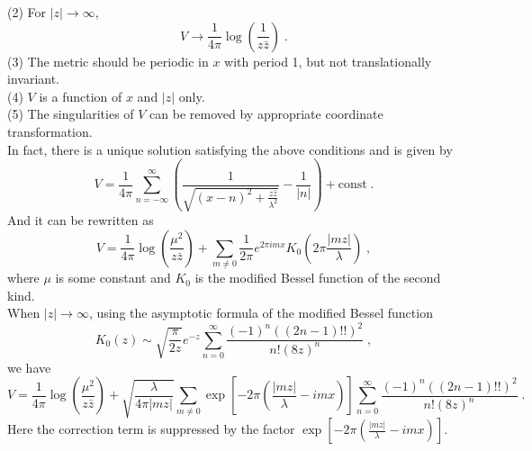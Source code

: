 \begin{survey}
(2) For $|z|\rightarrow \infty$,
$$V\rightarrow \frac{1}{4\pi}\log\left(\frac{1}{z\bar{z}}\right)\; .$$
(3) The metric should be periodic in $x$ with period 1, but not translationally invariant.\\
(4) $V$ is a function of $x$ and $|z|$ only.\\
(5) The singularities of $V$ can be removed by appropriate coordinate transformation.\\ \indent
In fact, there is a unique solution satisfying the above conditions and is given by
$$V=\frac{1}{4\pi}\sum_{n=-\infty}^{\infty}\left(\frac{1}{\sqrt{(x-n)^2+\frac{z\bar{z}}{\lambda^2}}}-\frac{1}{|n|}\right)+\textrm{const}\; .$$
And it can be rewritten as
$$V=\frac{1}{4\pi}\log\left(\frac{\mu^2}{z\bar{z}}\right)+\sum_{m\neq 0}\frac{1}{2\pi}e^{2\pi imx}K_0\left(2\pi \frac{|mz|}{\lambda}\right)\; ,$$
where $\mu$ is some constant and $K_0$ is the modified Bessel function of the second kind.\\ \indent
When $|z|\rightarrow \infty$, using the asymptotic formula of the modified Bessel function
$$K_0(z)\sim \sqrt{\frac{\pi}{2z}}e^{-z}\sum_{n=0}^{\infty}\frac{(-1)^n((2n-1)!!)^2}{n!(8z)^n}\; ,$$
we have
$$V=\frac{1}{4\pi}\log\left(\frac{\mu^2}{z\bar{z}}\right)+\sqrt{\frac{\lambda}{4\pi|mz|}}\sum_{m\neq 0}\exp\left[-2\pi\left(\frac{|mz|}{\lambda}-imx\right)\right]\sum_{n=0}^{\infty}\frac{(-1)^n((2n-1)!!)^2}{n!(8z)^n} \; .$$
Here the correction term is suppressed by the factor $\exp\left[-2\pi\left(\frac{|mz|}{\lambda}-imx\right)\right]$.\\
\\

\end{survey}
